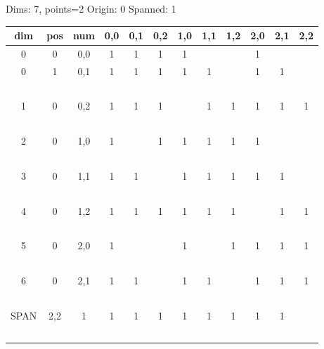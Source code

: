 Dims: 7, points=2 Origin: 0 Spanned: 1
\begin{tabular}{cccccccccccc}
\hline
  dim  &  pos  &  num  &  0,0  &  0,1  &  0,2  &  1,0  &  1,1  &  1,2  &  2,0  &  2,1  &  2,2  \\
\hline
   0   &   0   &  0,0  &   1   &   1   &   1   &   1   &       &       &   1   &       &       \\
   0   &   1   &  0,1  &   1   &   1   &   1   &   1   &   1   &       &   1   &   1   &       \\
  \\
   1   &   0   &  0,2  &   1   &   1   &   1   &       &   1   &   1   &   1   &   1   &   1   \\
  \\
   2   &   0   &  1,0  &   1   &       &   1   &   1   &   1   &   1   &   1   &       &       \\
  \\
   3   &   0   &  1,1  &   1   &   1   &       &   1   &   1   &   1   &   1   &   1   &       \\
  \\
   4   &   0   &  1,2  &   1   &   1   &   1   &   1   &   1   &   1   &       &   1   &   1   \\
  \\
   5   &   0   &  2,0  &   1   &       &       &   1   &       &   1   &   1   &   1   &   1   \\
  \\
   6   &   0   &  2,1  &   1   &   1   &       &   1   &   1   &       &   1   &   1   &   1   \\
  \\
 SPAN  &  2,2  &   1   &   1   &   1   &   1   &   1   &   1   &   1   &   1   &   1   &       \\
  \\
\hline
\end{tabular}
